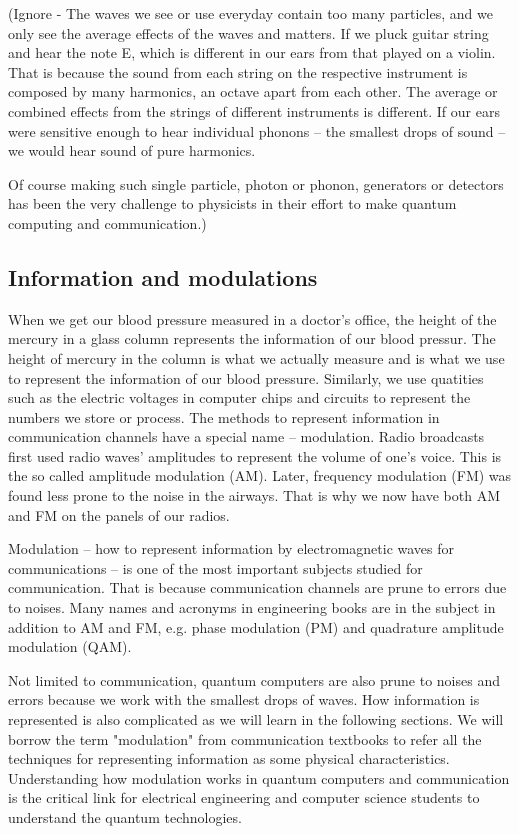 \documentclass{book}
\begin{document}
(Ignore - The waves we see or use everyday contain too many particles, and we only see the average effects of the waves and matters. If we pluck guitar string and hear the note E, which is different in our ears from that played on a violin. That is because the sound from each string on the respective instrument is composed by many harmonics, an octave apart from each other. The average or combined effects from the strings of different instruments is different. If our ears were sensitive enough to hear individual phonons -- the smallest drops of sound -- we would hear sound of pure harmonics.

Of course making such single particle, photon or phonon, generators or detectors has been the very challenge to physicists in their effort to make quantum computing and communication.)

\subsection{Information and modulations}
When we get our blood pressure measured in a doctor's office, the height of the mercury in a glass column represents the information of our blood pressur. The height of mercury in the column is what we actually measure and is what we use to represent the information of our blood pressure. Similarly, we use quatities such as the electric voltages in computer chips and circuits to represent the numbers we store or process. The methods to represent information in communication channels have a special name -- modulation. Radio broadcasts first used radio waves' amplitudes to represent the volume of one's voice. This is the so called amplitude modulation (AM). Later, frequency modulation (FM) was found less prone to the noise in the airways. That is why we now have both AM and FM on the panels of our radios.

Modulation -- how to represent information by electromagnetic waves for communications -- is one of the most important subjects studied for communication. That is because communication channels are prune to errors due to noises. Many names and acronyms in engineering books are in the subject in addition to AM and FM, e.g. phase modulation (PM) and quadrature amplitude modulation (QAM).

Not limited to communication, quantum computers are also prune to noises and errors because we work with the smallest drops of waves. How information is represented is also complicated as we will learn in the following sections. We will borrow the term "modulation" from communication textbooks to refer all the techniques for representing information as some physical characteristics. Understanding how modulation works in quantum computers and communication is the critical link for electrical engineering and computer science students to understand the quantum technologies. 
\end{document}
